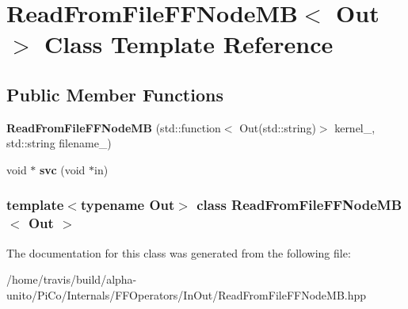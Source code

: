\hypertarget{class_read_from_file_f_f_node_m_b}{\section{\-Read\-From\-File\-F\-F\-Node\-M\-B$<$ \-Out $>$ \-Class \-Template \-Reference}
\label{class_read_from_file_f_f_node_m_b}
}
\subsection*{\-Public \-Member \-Functions}
\begin{DoxyCompactItemize}
\item 
\hypertarget{class_read_from_file_f_f_node_m_b_a16b4ed3bd25ff2ede113f868a3ae2f26}{{\bfseries \-Read\-From\-File\-F\-F\-Node\-M\-B} (std\-::function$<$ \-Out(std\-::string)$>$ kernel\-\_\-, std\-::string filename\-\_\-)}\label{class_read_from_file_f_f_node_m_b_a16b4ed3bd25ff2ede113f868a3ae2f26}

\item 
\hypertarget{class_read_from_file_f_f_node_m_b_aebc4fe338d07c777f2a58001f27597e5}{void $\ast$ {\bfseries svc} (void $\ast$in)}\label{class_read_from_file_f_f_node_m_b_aebc4fe338d07c777f2a58001f27597e5}

\end{DoxyCompactItemize}
\subsubsection*{template$<$typename \-Out$>$ class Read\-From\-File\-F\-F\-Node\-M\-B$<$ Out $>$}



\-The documentation for this class was generated from the following file\-:\begin{DoxyCompactItemize}
\item 
/home/travis/build/alpha-\/unito/\-Pi\-Co/\-Internals/\-F\-F\-Operators/\-In\-Out/\-Read\-From\-File\-F\-F\-Node\-M\-B.\-hpp\end{DoxyCompactItemize}
